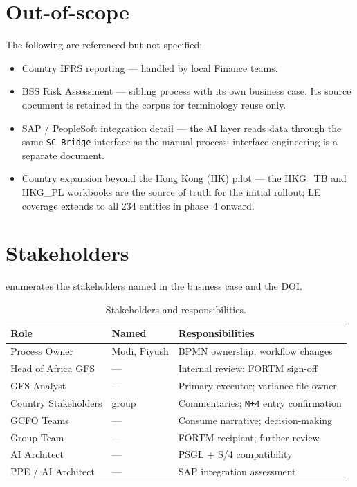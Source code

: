 \documentclass[11pt,a4paper,twoside]{report}
\begin{document}
\section{Out-of-scope}

The following are referenced but not specified:

\begin{itemize}
\item Country IFRS reporting --- handled by local Finance teams.
\item BSS Risk Assessment --- sibling process with its own business
case. Its source document is retained in the corpus for
terminology reuse only.
\item SAP / PeopleSoft integration detail --- the AI layer reads
data through the same \texttt{SC Bridge} interface as the
manual process; interface engineering is a separate document.
\item Country expansion beyond the Hong Kong (HK) pilot --- the
HKG\_TB and HKG\_PL workbooks are the source of truth for the
initial rollout; LE coverage extends to all 234 entities in
phase~4 onward.
\end{itemize}

\section{Stakeholders}

 enumerates the stakeholders named in the
business case and the DOI.

\begin{table}[htbp]
\caption{Stakeholders and responsibilities.}\label{tab:stakeholders}
\centering
\small
\begin{tabularx}{\linewidth}{@{}llX@{}}
\toprule
\textbf{Role} & \textbf{Named} & \textbf{Responsibilities} \\ \midrule
Process Owner             & Modi, Piyush & BPMN ownership; workflow changes \\
Head of Africa GFS        & ---          & Internal review; FORTM sign-off \\
GFS Analyst               & ---          & Primary executor; variance file owner \\
Country Stakeholders      & group        & Commentaries; \texttt{M+4} entry confirmation \\
GCFO Teams                & ---          & Consume narrative; decision-making \\
Group Team                & ---          & FORTM recipient; further review \\
AI Architect              & ---          & PSGL + S/4 compatibility \\
PPE / AI Architect        & ---          & SAP integration assessment \\
\bottomrule
\end{tabularx}
\end{table}
\end{document}
